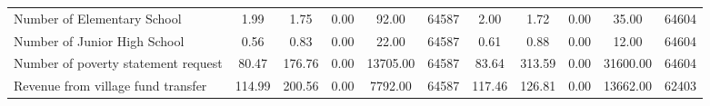 \begin{tabular}{l*{2}{ccccc}}
Number of Elementary School&     1.99&     1.75&     0.00&    92.00&    64587&     2.00&     1.72&     0.00&    35.00&    64604\\
Number of Junior High School&     0.56&     0.83&     0.00&    22.00&    64587&     0.61&     0.88&     0.00&    12.00&    64604\\
Number of poverty statement request&    80.47&   176.76&     0.00& 13705.00&    64587&    83.64&   313.59&     0.00& 31600.00&    64604\\
Revenue from village fund transfer&   114.99&   200.56&     0.00&  7792.00&    64587&   117.46&   126.81&     0.00& 13662.00&    62403\\
\bottomrule
\end{tabular}
